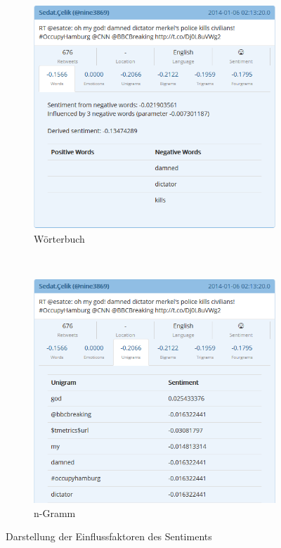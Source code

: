 \begin{figure}[ht]
\centering
\begin{subfigure}[t]{0.45\textwidth}
\includegraphics[width=\textwidth]{Bilder/Frontend/SentimentTweetsWords.png}
\caption{Wörterbuch}
\label{sentimenttweetswords}
\end{subfigure}
~
\begin{subfigure}[t]{0.45\textwidth}
\includegraphics[width=\textwidth]{Bilder/Frontend/SentimentTweetsUnigrams.png}
\caption{n-Gramm}
\label{sentimenttweetsunigrams}
\end{subfigure}
\caption{Darstellung der Einflussfaktoren des Sentiments}
\label{sentimenttweets}
\end{figure}

